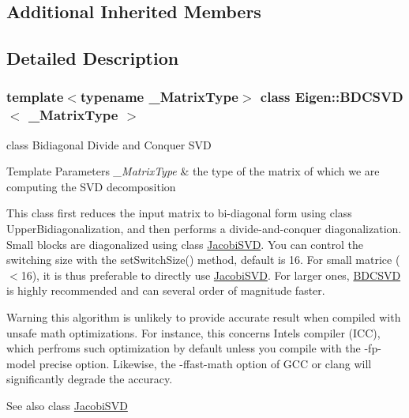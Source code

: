 \subsection*{Additional Inherited Members}


\subsection{Detailed Description}
\subsubsection*{template$<$typename \+\_\+\+Matrix\+Type$>$\newline
class Eigen\+::\+B\+D\+C\+S\+V\+D$<$ \+\_\+\+Matrix\+Type $>$}

class Bidiagonal Divide and Conquer S\+VD 


\begin{DoxyTemplParams}{Template Parameters}
{\em \+\_\+\+Matrix\+Type} & the type of the matrix of which we are computing the S\+VD decomposition\\
\hline
\end{DoxyTemplParams}
This class first reduces the input matrix to bi-\/diagonal form using class Upper\+Bidiagonalization, and then performs a divide-\/and-\/conquer diagonalization. Small blocks are diagonalized using class \mbox{\hyperlink{class_eigen_1_1_jacobi_s_v_d}{Jacobi\+S\+VD}}. You can control the switching size with the set\+Switch\+Size() method, default is 16. For small matrice ($<$16), it is thus preferable to directly use \mbox{\hyperlink{class_eigen_1_1_jacobi_s_v_d}{Jacobi\+S\+VD}}. For larger ones, \mbox{\hyperlink{class_eigen_1_1_b_d_c_s_v_d}{B\+D\+C\+S\+VD}} is highly recommended and can several order of magnitude faster.

\begin{DoxyWarning}{Warning}
this algorithm is unlikely to provide accurate result when compiled with unsafe math optimizations. For instance, this concerns Intel\textquotesingle{}s compiler (I\+CC), which perfroms such optimization by default unless you compile with the {\ttfamily -\/fp-\/model} {\ttfamily precise} option. Likewise, the {\ttfamily -\/ffast-\/math} option of G\+CC or clang will significantly degrade the accuracy.
\end{DoxyWarning}
\begin{DoxySeeAlso}{See also}
class \mbox{\hyperlink{class_eigen_1_1_jacobi_s_v_d}{Jacobi\+S\+VD}} 
\end{DoxySeeAlso}


